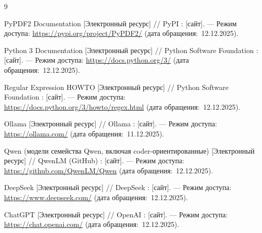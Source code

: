 
\begin{thebibliography}{9}

	PyPDF2 Documentation [Электронный ресурс] // PyPI : [сайт]. --- Режим доступа: \url{https://pypi.org/project/PyPDF2/} (дата обращения:~12.12.2025).

	Python 3 Documentation [Электронный ресурс] // Python Software Foundation : [сайт]. --- Режим доступа: \url{https://docs.python.org/3/} (дата обращения:~12.12.2025).

	Regular Expression HOWTO [Электронный ресурс] // Python Software Foundation : [сайт]. --- Режим доступа: \url{https://docs.python.org/3/howto/regex.html} (дата обращения:~12.12.2025).

	Ollama [Электронный ресурс] // Ollama : [сайт]. --- Режим доступа: \url{https://ollama.com/} (дата обращения:~11.12.2025).

	Qwen (модели семейства Qwen, включая coder-ориентированные) [Электронный ресурс] // QwenLM (GitHub) : [сайт]. --- Режим доступа: \url{https://github.com/QwenLM/Qwen} (дата обращения:~12.12.2025).

	DeepSeek [Электронный ресурс] // DeepSeek : [сайт]. --- Режим доступа: \url{https://www.deepseek.com/} (дата обращения:~12.12.2025).

	ChatGPT [Электронный ресурс] // OpenAI : [сайт]. --- Режим доступа: \url{https://chat.openai.com/} (дата обращения:~12.12.2025).

\end{thebibliography}
